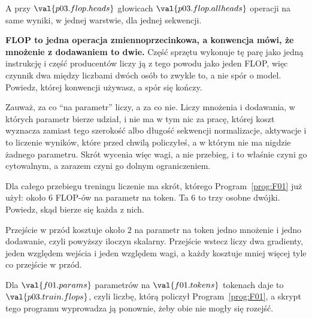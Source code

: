 \begin{fr}
A przy $\val{p03.flop.heads}$ głowicach $\val{p03.flop.allheads}$ operacji
\dash{} na same wyniki, w jednej warstwie, dla jednej sekwencji.

\begin{note}
\textbf{FLOP to jedna operacja zmiennoprzecinkowa, a konwencja mówi, że
mnożenie z dodawaniem to dwie.} Część sprzętu wykonuje tę parę jako jedną
instrukcję i część producentów liczy ją z tego powodu jako jeden FLOP, więc
czynnik dwa między liczbami dwóch osób to zwykle to, a nie spór o model.
Powiedz, której konwencji używasz, a spór się kończy.
\end{note}

Zauważ, za co \enquote{na parametr} liczy, a za co nie. Liczy mnożenia i
dodawania, w których parametr bierze udział, i nie ma w tym nic za pracę,
której koszt wyznacza zamiast tego szerokość albo długość sekwencji \dash{}
normalizacje, aktywacje i to liczenie wyników, które przed chwilą policzyłeś, a
w którym nie ma nigdzie żadnego parametru. Skrót wycenia więc wagi, a nie
przebieg, i to właśnie czyni go cytowalnym, a zarazem czyni go dolnym
ograniczeniem.

Dla całego przebiegu treningu liczenie ma skrót, którego Program~\ref{prog:F01}
już użył: około $6$ FLOP-ów na parametr na token. Ta $6$ to trzy osobne
dwójki. Powiedz, skąd bierze się każda z nich.
\dotline
\nextframe
\end{fr}

\begin{fr}

Przejście w przód kosztuje około $2$ na parametr na token \dash{} jedno
mnożenie i jedno dodawanie, czyli powyższy iloczyn skalarny. Przejście wstecz
liczy dwa gradienty, jeden względem wejścia i jeden względem wagi, a każdy
kosztuje mniej więcej tyle co przejście w przód.

Dla $\val{f01.params}$ parametrów na $\val{f01.tokens}$ tokenach daje to
$\val{p03.train.flops}$, czyli liczbę, którą policzył Program~\ref{prog:F01}, a
skrypt tego programu wyprowadza ją ponownie, żeby obie nie mogły się rozejść.
\end{fr}

